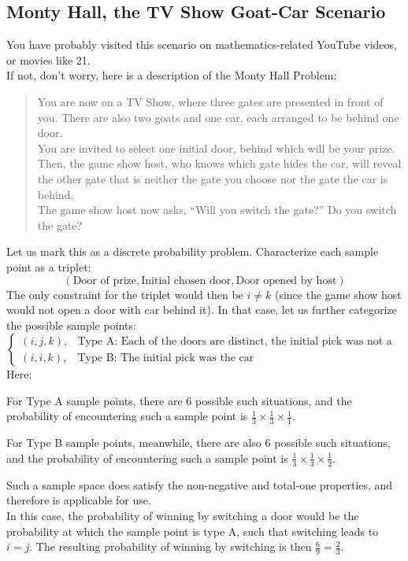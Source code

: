 \subsection{Monty Hall, the TV Show Goat-Car Scenario}
You have probably visited this scenario on mathematics-related YouTube videos, or movies like 21. \\
If not, don't worry, here is a description of the Monty Hall Problem:
\begin{quote}
    You are now on a TV Show, where three gates are presented in front of you. There are also two goats and one car, each arranged to be behind one door. \\
    You are invited to select one initial door, behind which will be your prize. \\
    Then, the game show host, who knows which gate hides the car, will reveal the other gate that is neither the gate you choose nor the gate the car is behind. \\
    The game show host now asks, ``Will you switch the gate?'' Do you switch the gate?
\end{quote}
Let us mark this as a discrete probability problem. Characterize each sample point as a triplet:
\[(\text{Door of prize}, \text{Initial chosen door}, \text{Door opened by host})\]
The only constraint for the triplet would then be $i \neq k$ (since the game show host would not open a door with car behind it).
In that case, let us further categorize the possible sample points:
\[
    \begin{cases}
        (i, j, k), &\text{Type A: Each of the doors are distinct, the initial pick was not a car} \\
        (i, i, k), &\text{Type B: The initial pick was the car}
    \end{cases}
\]
Here:
\begin{bindenum}
    \item[] For Type A sample points, there are $6$ possible such situations, and the probability of encountering such a sample point is $\frac{1}{3} \times \frac{1}{3} \times \frac{1}{1}$.
    \item[] For Type B sample points, meanwhile, there are also $6$ possible such situations, and the probability of encountering such a sample point is $\frac{1}{3} \times \frac{1}{3} \times \frac{1}{2}$.
\end{bindenum}
Such a sample space does satisfy the non-negative and total-one properties, and therefore is applicable for use. \\
In this case, the probability of winning by switching a door would be the probability at which the sample point is type A, such that switching leads to $i = j$. The resulting probability of winning by switching is then $\frac{6}{9} = \frac{2}{3}$.

